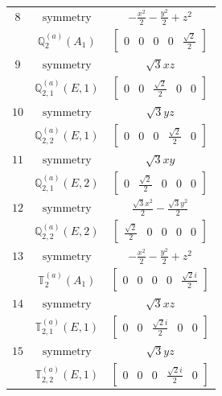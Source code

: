 \documentclass[fleqn,8pt,landscape]{jsarticle}
\begin{document}
\begin{longtable}{ccc}
$ 8 $ & $ \text{symmetry} $ & $ - \frac{x^{2}}{2} - \frac{y^{2}}{2} + z^{2} $ \\
$  $ & $ \mathbb{Q}_{2}^{(a)}(A_{1}) $ & $ \begin{bmatrix} 0 & 0 & 0 & 0 & \frac{\sqrt{2}}{2} \end{bmatrix} $ \\ \hline
$ 9 $ & $ \text{symmetry} $ & $ \sqrt{3} x z $ \\
$  $ & $ \mathbb{Q}_{2,1}^{(a)}(E,1) $ & $ \begin{bmatrix} 0 & 0 & \frac{\sqrt{2}}{2} & 0 & 0 \end{bmatrix} $ \\ \hline
$ 10 $ & $ \text{symmetry} $ & $ \sqrt{3} y z $ \\
$  $ & $ \mathbb{Q}_{2,2}^{(a)}(E,1) $ & $ \begin{bmatrix} 0 & 0 & 0 & \frac{\sqrt{2}}{2} & 0 \end{bmatrix} $ \\ \hline
$ 11 $ & $ \text{symmetry} $ & $ \sqrt{3} x y $ \\
$  $ & $ \mathbb{Q}_{2,1}^{(a)}(E,2) $ & $ \begin{bmatrix} 0 & \frac{\sqrt{2}}{2} & 0 & 0 & 0 \end{bmatrix} $ \\ \hline
$ 12 $ & $ \text{symmetry} $ & $ \frac{\sqrt{3} x^{2}}{2} - \frac{\sqrt{3} y^{2}}{2} $ \\
$  $ & $ \mathbb{Q}_{2,2}^{(a)}(E,2) $ & $ \begin{bmatrix} \frac{\sqrt{2}}{2} & 0 & 0 & 0 & 0 \end{bmatrix} $ \\ \hline
$ 13 $ & $ \text{symmetry} $ & $ - \frac{x^{2}}{2} - \frac{y^{2}}{2} + z^{2} $ \\
$  $ & $ \mathbb{T}_{2}^{(a)}(A_{1}) $ & $ \begin{bmatrix} 0 & 0 & 0 & 0 & \frac{\sqrt{2} i}{2} \end{bmatrix} $ \\ \hline
$ 14 $ & $ \text{symmetry} $ & $ \sqrt{3} x z $ \\
$  $ & $ \mathbb{T}_{2,1}^{(a)}(E,1) $ & $ \begin{bmatrix} 0 & 0 & \frac{\sqrt{2} i}{2} & 0 & 0 \end{bmatrix} $ \\ \hline
$ 15 $ & $ \text{symmetry} $ & $ \sqrt{3} y z $ \\
$  $ & $ \mathbb{T}_{2,2}^{(a)}(E,1) $ & $ \begin{bmatrix} 0 & 0 & 0 & \frac{\sqrt{2} i}{2} & 0 \end{bmatrix} $ \\ \hline

\end{longtable}
\end{document}

